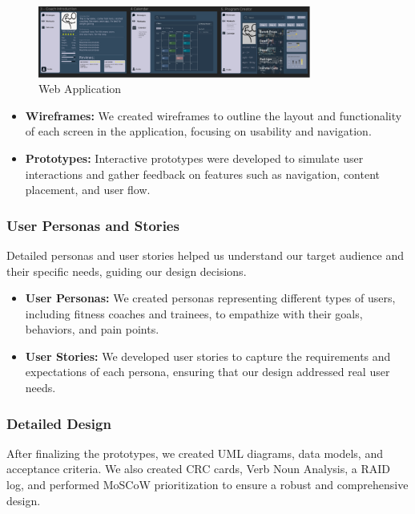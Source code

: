   \begin{figure}[H]
    \centering
    \includegraphics[width=0.8\textwidth]{images/figma2.png}
    \caption{Web Application}
    \label{fig:figma2}
  \end{figure}


\begin{itemize}
  \item \textbf{Wireframes:} We created wireframes to outline the layout and functionality of each screen in the application, focusing on usability and navigation.
  
  \item \textbf{Prototypes:} Interactive prototypes were developed to simulate user interactions and gather feedback on features such as navigation, content placement, and user flow.
\end{itemize}

\subsubsection{User Personas and Stories}
Detailed personas and user stories helped us understand our target audience and their specific needs, guiding our design decisions.

\begin{itemize}
  \item \textbf{User Personas:} We created personas representing different types of users, including fitness coaches and trainees, to empathize with their goals, behaviors, and pain points.
  
  \item \textbf{User Stories:} We developed user stories to capture the requirements and expectations of each persona, ensuring that our design addressed real user needs.
\end{itemize}

\subsubsection{Detailed Design}
After finalizing the prototypes, we created UML diagrams, data models, and acceptance criteria. We also created CRC cards, Verb Noun Analysis, a RAID log, and performed MoSCoW prioritization to ensure a robust and comprehensive design.

